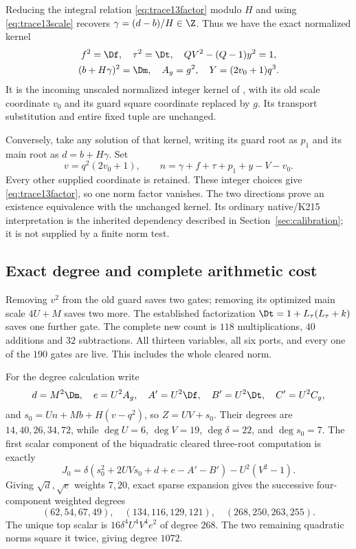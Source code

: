 Reducing the integral relation \eqref{eq:trace13factor} modulo $H$
and using \eqref{eq:trace13scale} recovers
$\gamma=(d-b)/H\in\Z$. Thus we have the exact normalized kernel
\begin{equation}
 \begin{gathered}
 f^2=\Df,\quad\tau^2=\Dt,\quad
 QV^2-(Q-1)y^2=1,\\
 (b+H\gamma)^2=\Dm,\quad A_g=g^2,\quad
 Y=(2v_0+1)q^3.
 \end{gathered}
 \label{eq:trace13kernel}
\end{equation}
It is the incoming unscaled normalized integer kernel of \cite{fusion},
with its old scale coordinate $v_0$ and its guard square coordinate
replaced by $g$. Its transport substitution and entire fixed tuple
are unchanged.

Conversely, take any solution of that kernel, writing its guard root as
$p_1$ and its main root as $d=b+H\gamma$. Set
\begin{equation}
 v=q^2(2v_0+1),\qquad
 n=\gamma+f+\tau+p_1+y-V-v_0.
 \label{eq:trace13inverse}
\end{equation}
Every other supplied coordinate is retained. These integer choices give
\eqref{eq:trace13factor}, so one norm factor vanishes. The two directions
prove an existence equivalence with the unchanged kernel. Its ordinary
native/K215 interpretation is the inherited dependency described in
Section~\ref{sec:calibration}; it is not supplied by a finite norm test.

\subsection{Exact degree and complete arithmetic cost}

Removing $v^2$ from the old guard saves two gates; removing its optimized
main scale $4U+M$ saves two more. The established factorization
$\Dt=1+L_\tau(L_\tau+k)$ saves one further gate. The complete new
count is $118$ multiplications, $40$ additions and $32$ subtractions.
All thirteen variables, all six ports, and every one of the $190$ gates
are live. This includes the whole cleared norm.

For the degree calculation write
\[
 d=M^2\Dm,\quad e=U^2A_g,\quad A'=U^2\Df,
 \quad B'=U^2\Dt,\quad C'=U^2C_y,
\]
and $s_0=Un+Mb+H(v-q^2)$, so $Z=UV+s_0$. Their degrees are
$14,40,26,34,72$, while $\deg U=6$, $\deg V=19$,
$\deg\delta=22$, and $\deg s_0=7$. The first scalar component of the
biquadratic cleared three-root computation is exactly
\[
 J_0=\delta(s_0^2+2UVs_0+d+e-A'-B')-U^2(V^2-1).
\]
Giving $\sqrt d,\sqrt e$ weights $7,20$, exact sparse expansion gives
the successive four-component weighted degrees
\begin{equation}
 (62,54,67,49),\quad(134,116,129,121),\quad
 (268,250,263,255).
 \label{eq:trace13componentdegrees}
\end{equation}
The unique top scalar is $16\delta^4U^4V^4e^2$ of degree $268$.
The two remaining quadratic norms square it twice, giving degree $1072$.


